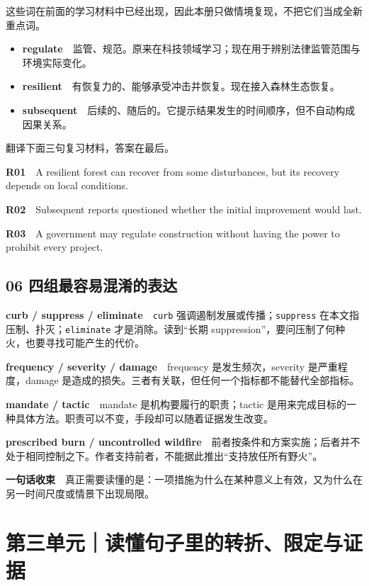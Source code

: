 \documentclass[a4paper,11pt,openany]{report}
\providecommand{\tightlist}{\setlength{\itemsep}{1pt}\setlength{\parskip}{0pt}}
\begin{document}
这些词在前面的学习材料中已经出现，因此本册只做情境复现，不把它们当成全新重点词。

\begin{itemize}
\tightlist
\item
  \textbf{regulate}　监管、规范。原来在科技领域学习；现在用于辨别法律监管范围与环境实际变化。
\item
  \textbf{resilient}　有恢复力的、能够承受冲击并恢复。现在接入森林生态恢复。
\item
  \textbf{subsequent}　后续的、随后的。它提示结果发生的时间顺序，但不自动构成因果关系。
\end{itemize}

翻译下面三句复习材料，答案在最后。

\textbf{R01}　A resilient forest can recover from some disturbances, but its recovery depends on local conditions.

\textbf{R02}　Subsequent reports questioned whether the initial improvement would last.

\textbf{R03}　A government may regulate construction without having the power to prohibit every project.

\section{06 四组最容易混淆的表达}\label{ux56dbux7ec4ux6700ux5bb9ux6613ux6df7ux6dc6ux7684ux8868ux8fbe}

\textbf{curb / suppress / eliminate}　\texttt{curb} 强调遏制发展或传播；\texttt{suppress} 在本文指压制、扑灭；\texttt{eliminate} 才是消除。读到``长期 suppression''，要问压制了何种火，也要寻找可能产生的代价。

\textbf{frequency / severity / damage}　frequency 是发生频次，severity 是严重程度，damage 是造成的损失。三者有关联，但任何一个指标都不能替代全部指标。

\textbf{mandate / tactic}　mandate 是机构要履行的职责；tactic 是用来完成目标的一种具体方法。职责可以不变，手段却可以随着证据发生改变。

\textbf{prescribed burn / uncontrolled wildfire}　前者按条件和方案实施；后者并不处于相同控制之下。作者支持前者，不能据此推出``支持放任所有野火''。

\textbf{一句话收束}　真正需要读懂的是：一项措施为什么在某种意义上有效，又为什么在另一时间尺度或情景下出现局限。

\chapter{第三单元｜读懂句子里的转折、限定与证据}\label{ux7b2cux4e09ux5355ux5143ux8bfbux61c2ux53e5ux5b50ux91ccux7684ux8f6cux6298ux9650ux5b9aux4e0eux8bc1ux636e}
\end{document}
